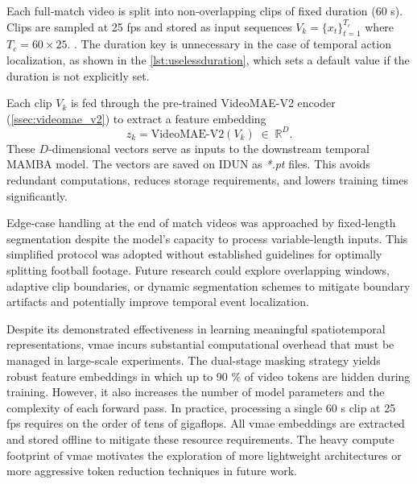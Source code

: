 
Each full‐match video is split into non‐overlapping clips of fixed duration (60 s). Clips are sampled at 25 fps and stored as input sequences $V_k=\{x_t\}_{t=1}^{T_c}$ where $T_c=60\times25$. . The duration key is unnecessary in the case of temporal action localization, as shown in the \autoref{lst:uselessduration}, which sets a default value if the duration is not explicitly set. 



Each clip $V_k$ is fed through the pre‐trained VideoMAE-V2 encoder (\autoref{ssec:videomae_v2}) to extract a feature embedding
\[
z_k = \mathrm{VideoMAE\text{-}V2}(V_k)\;\in\;\mathbb{R}^D.
\]
These $D$‐dimensional vectors serve as inputs to the downstream temporal MAMBA model. The vectors are saved on IDUN as \textit{*.pt} files. This avoids redundant computations, reduces storage requirements, and lowers training times significantly. 

Edge‐case handling at the end of match videos was approached by fixed‐length segmentation despite the model's capacity to process variable‐length inputs. This simplified protocol was adopted without established guidelines for optimally splitting football footage.  Future research could explore overlapping windows, adaptive clip boundaries, or dynamic segmentation schemes to mitigate boundary artifacts and potentially improve temporal event localization. 

Despite its demonstrated effectiveness in learning meaningful spatiotemporal representations, \acrlong{vmae} incurs substantial computational overhead that must be managed in large-scale experiments. The dual-stage masking strategy yields robust feature embeddings in which up to 90 \% of video tokens are hidden during training. However, it also increases the number of model parameters and the complexity of each forward pass. In practice, processing a single 60 s clip at 25 fps requires on the order of tens of gigaflops\cite{wang_videomae_2023}. All \acrlong{vmae} embeddings are extracted and stored offline to mitigate these resource requirements. The heavy compute footprint of \acrlong{vmae} motivates the exploration of more lightweight architectures or more aggressive token reduction techniques in future work. 

